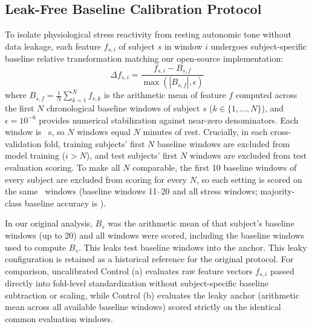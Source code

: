 \documentclass[conference]{IEEEtran}
\begin{document}
\subsection{Leak-Free Baseline Calibration Protocol}
To isolate physiological stress reactivity from resting autonomic tone without data leakage, each feature $f_{s,i}$ of subject $s$ in window $i$ undergoes subject-specific baseline relative transformation matching our open-source implementation:
\begin{equation}
    \Delta f_{s,i} = \frac{f_{s,i} - B_{s,f}}{\max(|B_{s,f}|, \epsilon)}
    \label{eq:norm}
\end{equation}
where $B_{s,f} = \frac{1}{N} \sum_{k=1}^N f_{s,k}$ is the arithmetic mean of feature $f$ computed across the first $N$ chronological baseline windows of subject $s$ ($k \in \{1, \dots, N\}$), and $\epsilon = 10^{-6}$ provides numerical stabilization against near-zero denominators. Each window is \valWindowDurationSec~s, so $N$ windows equal $N$ minutes of rest. Crucially, in each cross-validation fold, training subjects' first $N$ baseline windows are excluded from model training ($i > N$), and test subjects' first $N$ windows are excluded from test evaluation scoring. To make all $N$ comparable, the first 10 baseline windows of every subject are excluded from scoring for every $N$, so each setting is scored on the same \valEvalWindows\ windows (baseline windows 11--20 and all stress windows; majority-class baseline accuracy is \valMajorityClassPct).

In our original analysis, $B_s$ was the arithmetic mean of that subject's baseline windows (up to 20) and all \valTotalWindows windows were scored, including the baseline windows used to compute $B_s$. This leaks test baseline windows into the anchor. This leaky configuration is retained as a historical reference for the original protocol. For comparison, uncalibrated Control (a) evaluates raw feature vectors $f_{s,i}$ passed directly into fold-level standardization without subject-specific baseline subtraction or scaling, while Control (b) evaluates the leaky anchor (arithmetic mean across all available baseline windows) scored strictly on the identical \valEvalWindows common evaluation windows.
\end{document}
